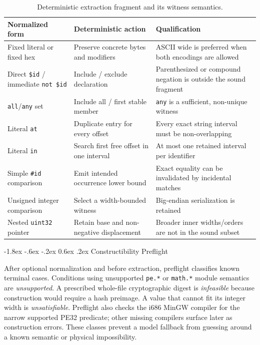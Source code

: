 \documentclass[11pt,twocolumn]{article}
\makeatletter
\newcommand{\code}[1]{\texttt{#1}}
\renewcommand\subsection{\@startsection{subsection}{2}{\z@}%
  {-1.8ex \@plus -.6ex \@minus -.2ex}%
  {0.6ex \@plus .2ex}%
  {\normalfont\normalsize\bfseries}}
\makeatother
\begin{document}
\begin{table}[t]
  \small
  \centering
  \begin{tabular}{@{}p{}p{}p{}@{}}
    \toprule
    \textbf{Normalized form} & \textbf{Deterministic action} & \textbf{Qualification} \\
    \midrule
    Fixed literal or fixed hex & Preserve concrete bytes and modifiers & ASCII wide is preferred when both encodings are allowed \\
    Direct \code{\$id} / immediate \code{not \$id} & Include / exclude declaration & Parenthesized or compound negation is outside the sound fragment \\
    \code{all}/\code{any} set & Include all / first stable member & \code{any} is a sufficient, non-unique witness \\
    Literal \code{at} & Duplicate entry for every offset & Every exact string interval must be non-overlapping \\
    Literal \code{in} & Search first free offset in one interval & At most one retained interval per identifier \\
    Simple \code{\#id} comparison & Emit intended occurrence lower bound & Exact equality can be invalidated by incidental matches \\
    Unsigned integer comparison & Select a width-bounded witness & Big-endian serialization is retained \\
    Nested \code{uint32} pointer & Retain base and non-negative displacement & Broader inner widths/orders are not in the sound subset \\
    \bottomrule
  \end{tabular}
  \caption{Deterministic extraction fragment and its witness semantics.}
  \label{tab:extract-fragment}
\end{table}

\subsection{Constructibility Preflight}

After optional normalization and before extraction, preflight classifies known
terminal cases. Conditions using unsupported \code{pe.*} or \code{math.*}
module semantics are \emph{unsupported}. A prescribed whole-file cryptographic
digest is \emph{infeasible} because construction would require a hash preimage.
A value that cannot fit its integer width is \emph{unsatisfiable}.
Preflight also checks the i686 MinGW compiler for the narrow supported PE32
predicate; other missing compilers surface later as construction errors. These
classes prevent a model fallback from guessing around a known semantic or
physical impossibility.
\end{document}
